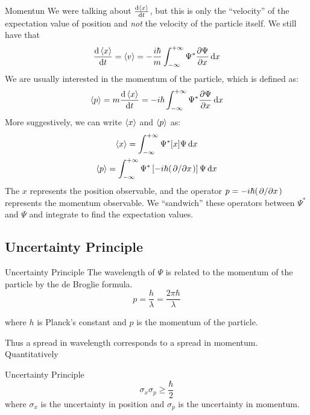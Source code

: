 \begin{frame}{Momentun}
	\small
	We were talking about $\dv{\ev x}{t}$, but this is only the ``velocity'' of the expectation value of position and \textit{not} the velocity of the particle itself. We still have that
	\[
		\dv{\ev x}{t} = \ev{v}  = -\frac{i\hbar}{m} \int_{-\infty}^{+\infty} \Psi^* \pdv{\Psi}{x} \dd{x}
	\]
	We are usually interested in the momentum of the particle, which is defined as:
	\begin{equation*}
		\ev p = m \dv{\ev x}{t} = -i\hbar \int_{-\infty}^{+\infty} \Psi^* \pdv{\Psi}{x} \dd{x}
	\end{equation*}
	More suggestively, we can write $\ev x$ and $\ev p$ as:
	\begin{gather*}
		\ev x =  \int_{-\infty}^{+\infty} \Psi^* [x] \Psi \dd{x}\\
		\ev p = \int_{-\infty}^{+\infty} \Psi^* \left[-i\hbar (\pdv*{x}) \right] \Psi \dd{x}
	\end{gather*}
	The $x$ represents the position observable, and the operator $ p = -i\hbar (\pdv*{x})$ represents the momentum observable. We ``sandwich'' these operators between $\Psi^*$ and $\Psi$ and integrate to find the expectation values.
\end{frame}


\subsection{Uncertainty Principle}

\begin{frame}{Uncertainty Principle}
	The wavelength of $\Psi$ is related to the momentum of the particle by the de Broglie formula.
	$$ p = \frac{h}{\lambda} = \frac{2\pi \hbar}{\lambda}$$

	where $h$ is Planck's constant and $p$ is the momentum of the particle.

	Thus a spread in wavelength corresponds to a spread in momentum. Quantitatively
	\begin{block}{Uncertainty Principle}
		\begin{equation*}
			\sigma_x \sigma_p \ge \frac{\hbar}{2}
		\end{equation*}
		where $\sigma_x$ is the uncertainty in position and $\sigma_p$ is the uncertainty in momentum.
	\end{block}

\end{frame}




